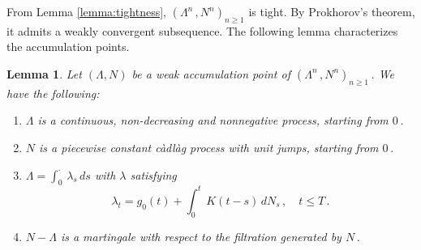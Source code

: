 \documentclass{article}
\newcommand{\1}{\mathbbm{1}}
\newtheorem{lemma}[theorem]{Lemma}
\numberwithin{equation}{section}
\begin{document}
From Lemma \ref{lemma:tightness}, $\left(\Lambda^n\,, N^n\right)_{n \geq 1}$ is tight. By Prokhorov's theorem, it admits a weakly convergent subsequence. The following lemma characterizes the accumulation points.
\begin{lemma}
\label{lemma:characterization_limit}
Let $\left(\Lambda, N\right)$ be a weak accumulation point of $\left(\Lambda^n\,, N^n\right)_{n \geq 1}\,$. We have the following:
\begin{enumerate}[label=(\roman*)]
    \item $\Lambda$ is a continuous, non-decreasing and nonnegative process, starting from $0\,$.
    \item $N$ is a piecewise constant càdlàg process with unit jumps, starting from $0\,$.
    \item $\Lambda = \int_0^{\cdot}\,\lambda_s\,ds$ with $\lambda$ satisfying
    $$
    \lambda_t = g_0(t) + \int_0^t\,K(t-s)\,dN_s\,, \quad t \leq T\,.
    $$
    \item $N - \Lambda$ is a martingale with respect to the filtration generated by $N\,$.
\end{enumerate}
\end{lemma}
\end{document}
